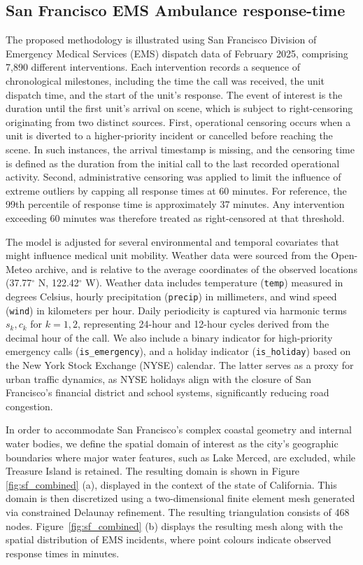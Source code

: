 \documentclass[11pt]{article}
\begin{document}
\subsection{San Francisco EMS Ambulance response-time}
The proposed methodology is illustrated using San Francisco Division of Emergency Medical Services (EMS) dispatch data of February 2025, comprising 7,890 different interventions. Each intervention records a sequence of chronological milestones, including the time the call was received, the unit dispatch time, and the start of the unit’s response. The event of interest is the duration until the first unit’s arrival on scene, which is subject to right-censoring originating from two distinct sources. First, operational censoring occurs when a unit is diverted to a higher-priority incident or cancelled before reaching the scene. In such instances, the arrival timestamp is missing, and the censoring time is defined as the duration from the initial call to the last recorded operational activity. Second, administrative censoring was applied to limit the influence of extreme outliers by capping all response times at 60 minutes. For reference, the 99th percentile of response time is approximately 37 minutes. Any intervention exceeding 60 minutes was therefore treated as right-censored at that threshold.


The model is adjusted for several environmental and temporal covariates that might influence medical unit mobility. Weather data were sourced from the Open-Meteo archive, and is relative to the average coordinates of the observed locations (37.77$^\circ$ N, 122.42$^\circ$ W).  Weather data includes temperature (\texttt{temp}) measured in degrees Celsius, hourly precipitation (\texttt{precip}) in millimeters, and wind speed (\texttt{wind}) in kilometers per hour. Daily periodicity is captured via harmonic terms $s_k, c_k$ for $k=1,2$, representing 24-hour and 12-hour cycles derived from the decimal hour of the call. We also include a binary indicator for high-priority emergency calls (\texttt{is\_emergency}), and a holiday indicator (\texttt{is\_holiday}) based on the New York Stock Exchange (NYSE) calendar. The latter serves as a proxy for urban traffic dynamics, as NYSE holidays align with the closure of San Francisco’s financial district and school systems, significantly reducing road congestion.

In order to accommodate San Francisco’s complex coastal geometry and internal water bodies, we define the spatial domain of interest as the city’s geographic boundaries where major water features, such as Lake Merced, are excluded, while Treasure Island is retained. The resulting domain is shown in Figure \ref{fig:sf_combined} (a), displayed in the context of the state of California.  This domain is then discretized using a two-dimensional finite element mesh generated via constrained Delaunay refinement. The resulting triangulation consists of 468 nodes. Figure~\ref{fig:sf_combined} (b) displays the resulting mesh along with the spatial distribution of EMS incidents, where point colours indicate observed response times in minutes.
\end{document}
